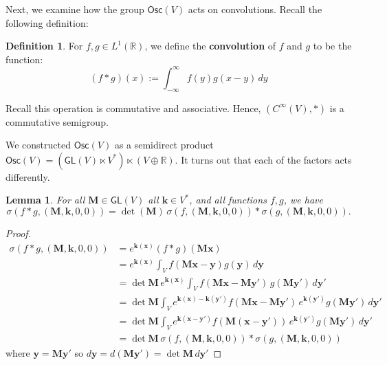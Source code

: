 \documentclass[12pt]{article}
\newcounter{counter}
\theoremstyle{definition}
\newtheorem{dfn}[counter]{Definition}
\theoremstyle{plain}
\newtheorem{lem}[counter]{Lemma}
\begin{document}
Next, we examine how the group \(\mathsf{Osc}(V)\) acts on convolutions. Recall the following definition:
\begin{dfn}
For $f,g\in L^1(\mathbb{R})$, we define the \textbf{convolution} of $f$ and $g$ to be the function:
\begin{equation}
(f*g)(x) := \int_{-\infty}^{\infty} f(y)g(x-y)\,dy
\end{equation}
\end{dfn}
Recall this operation is commutative and associative. Hence, $(C^\infty(V),*)$ is a commutative semigroup.

We constructed \(\mathsf{Osc}(V)\) as a semidirect product \(\mathsf{Osc}(V) = (\mathsf{GL}(V) \ltimes V^*) \ltimes (V \oplus \mathbb{R})\).  It turns out that each of the factors acts differently.\\

\begin{lem}\label{lem:ConvAct1}
    For all \(\mathbf{M} \in \mathsf{GL}(V)\) all \(\mathbf{k} \in V^*\), and all functions \(f,g\), we have
    \begin{equation}
        \sigma (f*g, (\mathbf{M}, \mathbf{k}, 0, 0))
        = \det (\mathbf{M}) \, \sigma (f, (\mathbf{M}, \mathbf{k}, 0, 0)) *
        \sigma (g, (\mathbf{M}, \mathbf{k}, 0, 0)).
    \end{equation}
\end{lem}

\begin{proof}
    \begin{align}
    \sigma (f*g, (\mathbf{M}, \mathbf{k}, 0, 0))
    &= e^{\mathbf{k}(\mathbf{x})} (f * g)(\mathbf{Mx}) \\
    &= e^{\mathbf{k}(\mathbf{x})} \int_V f(\mathbf{Mx}- \mathbf{y}) g(\mathbf{y}) \, d\mathbf{y} \\
    &= \det \mathbf{M} \, e^{\mathbf{k}(\mathbf{x})}
    \int_V f(\mathbf{Mx} - \mathbf{M}\mathbf{y}') \, g(\mathbf{My}') \, d\mathbf{y}' \\
     &= \det \mathbf{M}
    \int_V  e^{\mathbf{k}(\mathbf{x})- \mathbf{k}(\mathbf{y}')} f(\mathbf{Mx} - \mathbf{My}') \, e^{\mathbf{k}(\mathbf{y'})} g(\mathbf{My}') \, d\mathbf{y}' \\
    &= \det \mathbf{M}
    \int_V  e^{\mathbf{k}(\mathbf{x} - \mathbf{y}')} f(\mathbf{M} (\mathbf{x} - \mathbf{y}')) \, e^{\mathbf{k}(\mathbf{y'})} g(\mathbf{My}') \, d\mathbf{y}' \\
    &= \det \mathbf{M} \, \sigma (f, (\mathbf{M}, \mathbf{k}, 0, 0)) *
        \sigma (g, (\mathbf{M}, \mathbf{k}, 0, 0))
    \end{align}
    where \(\mathbf{y} = \mathbf{My}'\) so \(d\mathbf{y} =d(\mathbf{M}\mathbf{y}') = \det\mathbf{M}\,d\mathbf{y}'\)
\end{proof}
\end{document}
